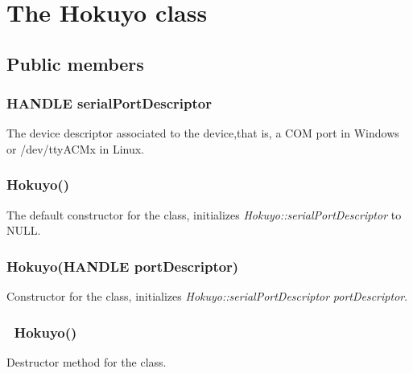\documentclass{book}
\begin{document}
\section{The Hokuyo class}

\subsection{Public members}
\subsubsection{HANDLE serialPortDescriptor}
The device descriptor associated to the device,that is, a COM port in Windows or /dev/ttyACMx in Linux.\\

\subsubsection{Hokuyo()}
The default constructor for the class, initializes \textit{Hokuyo::serialPortDescriptor} to NULL.\\
\subsubsection{Hokuyo(HANDLE portDescriptor)}
Constructor for the class, initializes \textit{Hokuyo::serialPortDescriptor} \textit{portDescriptor}.\\
\subsubsection{	~Hokuyo()}
Destructor method for the class.\\
\end{document}
